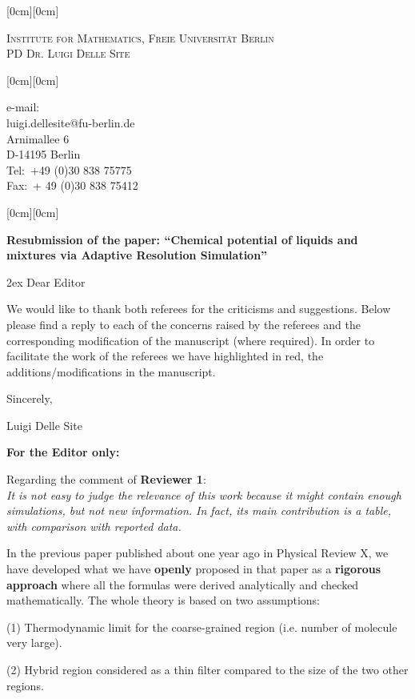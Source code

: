 \documentclass[12pt]{article}
\newcommand{\kopf}{\noindent
\raisebox{2.5cm}[0cm][0cm]
{
\parbox[c]{0.88\textwidth}
{
\begin{center}
\textsc{\large Institute for Mathematics, Freie Universit\"{a}t Berlin}\\
\textsc{ PD Dr. Luigi Delle Site}
\end{center}
}
}}
\begin{document}
\kopf
\vspace{2cm}
\hfill\raisebox{1.5cm}[0cm][0cm]
{\parbox[t]{0.34\textwidth}
{e-mail:\\
{\small luigi.dellesite@fu-berlin.de}\\
Arnimallee 6\\
D-14195 Berlin\\
Tel:\ +49 (0)30 838 75775 \\
Fax:\ + 49 (0)30 838 75412 \\
}}
\vspace{3cm}
\noindent\raisebox{1.5cm}[0cm][0cm]
{}
\vspace{1cm}

\textbf{Resubmission of the paper: ``Chemical potential of liquids and mixtures via Adaptive Resolution Simulation''}

\vspace{1cm}
\parskip 2ex
Dear Editor

We would like to thank both referees for the criticisms and suggestions.
Below please find a reply to each of the concerns raised by the referees and the
corresponding modification of the manuscript (where required).
In order to facilitate the work of the referees we have highlighted in red, the additions/modifications in the manuscript.

\vskip 1cm
Sincerely,

Luigi Delle Site

\newpage

{\bf For the Editor only:}


Regarding the comment of {\bf Reviewer 1}:\\
{\color{blue} \it  It is not easy to judge the relevance of this
  work because it might contain enough simulations, but not new information. In fact, its main contribution is a table, with comparison with reported data.}

In the previous paper published about one year ago in Physical Review X,
we have developed what we have {\bf openly} proposed in that paper as a {\bf rigorous approach} where all the formulas were derived analytically and checked mathematically.
The whole theory is based on two assumptions:

(1) Thermodynamic limit for the coarse-grained region (i.e. number of molecule very large).

(2) Hybrid region considered as a thin filter compared to the size of the two other regions.
\end{document}
